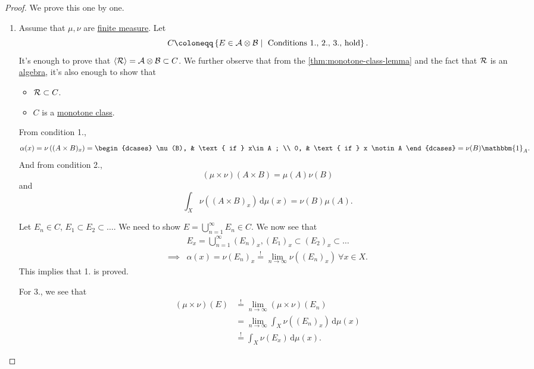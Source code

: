 \begin{proof}
	We prove this one by one.
	\begin{enumerate}
		\item Assume that \(\mu , \nu \) are \hyperref[def:finite-measure]{finite measure}. Let
		      \[
			      C \coloneqq \left\{E\in \mathcal{\MakeUppercase{a}} \otimes \mathcal{\MakeUppercase{b}} \mid \text{ Conditions 1., 2., 3., hold} \right\}.
		      \]
		      It's enough to prove that \(\left< \mathcal{\MakeUppercase{r}}  \right> = \mathcal{\MakeUppercase{a}} \otimes \mathcal{\MakeUppercase{b}} \subset C\).
		      We further observe that from the \autoref{thm:monotone-class-lemma} and the fact that \(\mathcal{\MakeUppercase{r}} \) is an \hyperref[def:algebra]{algebra},
		      it's also enough to show that
		      \begin{itemize}
			      \item \(\mathcal{\MakeUppercase{r}} \subset C\).
			      \item \(C\) is a \hyperref[def:monotone-class]{monotone class}.
		      \end{itemize}
		      \par From condition 1.,
		      \[
			      \alpha (x) = \nu \left((A\times B)_x\right) = \begin{dcases}
				      \nu (B), & \text{ if } x\in A ;   \\
				      0,       & \text{ if } x \notin A
			      \end{dcases} = \nu (B)\mathbbm{1}_{A}.
		      \]
		      And from condition 2.,
		      \[
			      (\mu \times \nu )(A\times B) = \mu (A)\nu (B)
		      \]
		      and
		      \[
			      \int _X \nu ((A\times B)_x)\,\mathrm{d} \mu (x) = \nu (B)\mu (A).
		      \]

		      \par Let \(E_{n} \in C\), \(E_1\subset E_{2}\subset \ldots\). We need to show \(E = \bigcup\limits_{n=1}^{\infty} E_{n} \in C\).
		      We now see that
		      \[
			      \begin{split}
				      &E_{x}  = \bigcup\limits_{n=1}^{\infty} (E_{n} )_x, (E_1)_x\subset (E_2)_x\subset \ldots\\
				      \implies &\alpha (x) = \nu (E_n)_x \overset{\hyperref[thm:measure-space-continuity-from-below]{!}}{=} \lim\limits_{n \to \infty} \nu ((E_n)_x)\ \forall x\in X.
			      \end{split}
		      \]
		      This implies that 1. is proved.

		      For 3., we see that
		      \[
			      \begin{split}
				      (\mu \times \nu )(E)&\overset{\hyperref[thm:measure-space-continuity-from-below]{!}}{=}\lim\limits_{n \to \infty} (\mu \times \nu )(E_{n} )\\
				      &= \lim\limits_{n \to \infty} \int _X \nu ((E_{n})_x) \,\mathrm{d} \mu (x)\\
				      &\overset{\hyperref[thm:MCT]{!}}{=} \int _X \nu (E_{x} )\,\mathrm{d} \mu (x).
			      \end{split}
		      \]


\end{enumerate}
\end{proof}
